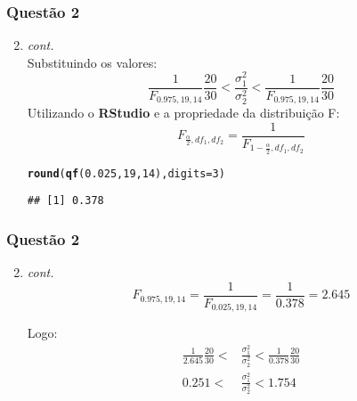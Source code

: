 \documentclass{beamer}\usepackage[]{graphicx}\usepackage[]{color}
\makeatletter
\newcommand{\hlnum}[1]{\textcolor[rgb]{0.686,0.059,0.569}{#1}}%
\newcommand{\hlstd}[1]{\textcolor[rgb]{0.345,0.345,0.345}{#1}}%
\newcommand{\hlkwc}[1]{\textcolor[rgb]{0.333,0.667,0.333}{#1}}%
\newcommand{\hlkwd}[1]{\textcolor[rgb]{0.737,0.353,0.396}{\textbf{#1}}}%
\newenvironment{kframe}{%
 \def\at@end@of@kframe{}%
 \ifinner\ifhmode%
  \def\at@end@of@kframe{\end{minipage}}%
  \begin{minipage}{\columnwidth}%
 \fi\fi%
 \def\FrameCommand##1{\hskip\@totalleftmargin \hskip-\fboxsep
 \colorbox{shadecolor}{##1}\hskip-\fboxsep
     \hskip-\linewidth \hskip-\@totalleftmargin \hskip\columnwidth}%
 \MakeFramed {\advance\hsize-\width
   \@totalleftmargin\z@ \linewidth\hsize
   \@setminipage}}%
 {\par\unskip\endMakeFramed%
 \at@end@of@kframe}
\newenvironment{knitrout}{}{} %
\makeatother
\begin{document}
	\begin{frame}[fragile]
		\frametitle{Questão 2}
		\begin{enumerate}
			\setcounter{enumi}{1}
			\item \textit{cont.}\\
			Substituindo os valores:\\
			$$\frac{1}{F_{0.975,19,14}}\frac{20}{30} < \frac{\sigma_{1}^{2}}{\sigma_{2}^{2}} < \frac{1}{F_{0.975,19,14}}\frac{20}{30}$$
			Utilizando o \textbf{RStudio} e a propriedade da distribuição F:$$F_{\frac{\alpha}{2},df_{1},df_{2}} = \frac{1}{F_{1-\frac{\alpha}{2},df_{1},df_{2}}}$$
\begin{knitrout}
\color{fgcolor}\begin{kframe}
\begin{alltt}
\hlkwd{round}\hlstd{(}\hlkwd{qf}\hlstd{(}\hlnum{0.025}\hlstd{,}\hlnum{19}\hlstd{,}\hlnum{14}\hlstd{),}\hlkwc{digits} \hlstd{=} \hlnum{3}\hlstd{)}
\end{alltt}
\begin{verbatim}
## [1] 0.378
\end{verbatim}
\end{kframe}
\end{knitrout}
			
		\end{enumerate}
	\end{frame}
	
	\begin{frame}
		\frametitle{Questão 2}
		\begin{enumerate}
			\setcounter{enumi}{1}
			\item \textit{cont.}\\
			$$F_{0.975,19,14} = \frac{1}{F_{0.025,19,14}} = \frac{1}{0.378} = 2.645$$
			
			Logo:
			\begin{align*}
				\frac{1}{2.645}\frac{20}{30} < &\frac{\sigma_{1}^{2}}{\sigma_{2}^{2}} < \frac{1}{0.378}\frac{20}{30}\\ 0.251 < &\frac{\sigma_{1}^{2}}{\sigma_{2}^{2}} < 1.754
			\end{align*}
		\end{enumerate}	
	\end{frame}
\end{document}
